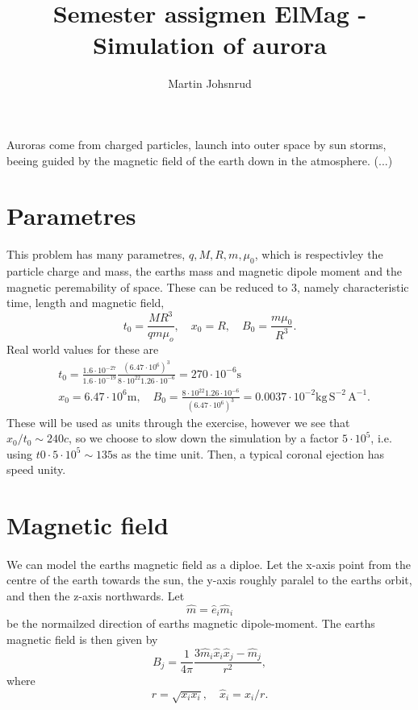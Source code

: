 \documentclass{article}
\title{Semester assigmen ElMag - Simulation of aurora}
\author{Martin Johsnrud}
\begin{document}
    \maketitle

    Auroras come from charged particles, launch into outer space by sun storms, beeing guided by the magnetic field of the earth down in the atmosphere. (...) 
    
    \section*{Parametres}
        This problem has many parametres, $q, M, R, m, \mu_0$, which is respectivley the particle charge and mass, the earths mass and magnetic dipole moment and the magnetic peremability of space. These can be reduced to 3, namely characteristic time, length and magnetic field,
        \begin{equation*}
            t_0 = \frac{M R^3}{q m \mu_o}, \quad x_0 = R, \quad B_0 = \frac{m \mu_0}{R^3}.
        \end{equation*}
        Real world values for these are  
        \begin{align*}
            & t_0 = \frac{1.6 \cdot 10^{-27}}{1.6\cdot10^{-19}}\frac{(6.47 \cdot 10^6)^3 }{8 \cdot 10^{22} 1.26 \cdot 10^{-6} } = 270 \cdot 10^{-6} \textrm{s}\\
            & x_0 = 6.47 \cdot 10^6 \textrm{m}, \quad
            B_0 = \frac{8 \cdot 10^{22} 1.26 \cdot 10^{-6}}{(6.47 \cdot 10^6)^3} = 0.0037 \cdot 10^{-2} \textrm{kg} \, \textrm{S}^{-2} \, \textrm{A}^{-1}.
        \end{align*}
        These will be used as units through the exercise, however we see that $x_0 / t_0 \sim 240 c$, so we choose to slow down the simulation by a factor $ 5\cdot 10^5$, i.e. using $t0 \cdot 5\cdot 10^5 \sim 135 \textrm{s}$ as the time unit. Then, a typical coronal ejection has speed unity.
    
    \section*{Magnetic field}
    \paragraph{}
    We can model the earths magnetic field as a diploe. Let the x-axis point from the centre of the earth towards the sun, the y-axis roughly paralel to the earths orbit, and then the z-axis northwards. Let
        \begin{equation*}
            \hat m = \hat e_i \hat m_i
        \end{equation*}
        be the normailzed direction of earths magnetic dipole-moment. The earths magnetic field is then given by
        \begin{equation}
            B_j = \frac{1}{4\pi} \frac{3\hat m_i \hat x_i \hat x_j - \hat m_j}{r^2},
        \end{equation}
        where
        \begin{equation*}
            r = \sqrt{x_ix_i}, \quad \hat x_i = x_i / r.
        \end{equation*}
\end{document}
